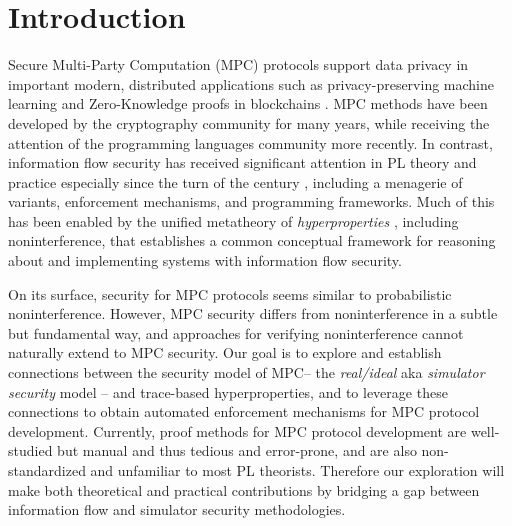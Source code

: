 \section{Introduction}

Secure Multi-Party Computation (MPC) protocols support data privacy in
important modern, distributed applications such as privacy-preserving
machine learning \cite{li2021privacy, knott2021crypten,
  koch2020privacy, liu2020privacy} and Zero-Knowledge proofs in
blockchains \cite{ishai2009zero, lu2019honeybadgermpc,
  gao2022symmeproof, tomaz2020preserving}. MPC methods have been
developed by the cryptography community for many years, while
receiving the attention of the programming languages community more
recently. In contrast, information flow security has received
significant attention in PL theory and practice especially since the
turn of the century \cite{1159651}, including a menagerie of variants,
enforcement mechanisms, and programming frameworks. Much of this has
been enabled by the unified metatheory of \emph{hyperproperties}
\cite{10.5555/1891823.1891830}, including noninterference, that
establishes a common conceptual framework for reasoning about and
implementing systems with information flow security.

On its surface, security for MPC protocols seems similar to
probabilistic noninterference. However, MPC security differs from
noninterference in a subtle but fundamental way, and approaches for
verifying noninterference cannot naturally extend to MPC security. Our
goal is to explore and establish connections between the security
model of MPC-- the \emph{real/ideal} aka \emph{simulator security}
model -- and trace-based hyperproperties, and to leverage these
connections to obtain automated enforcement mechanisms for MPC
protocol development. Currently, proof methods for MPC protocol
development are well-studied \cite{Lindell2017} but manual and thus
tedious and error-prone, and are also non-standardized and unfamiliar
to most PL theorists. Therefore our exploration will make both
theoretical and practical contributions by bridging a gap between
information flow and simulator security methodologies.

